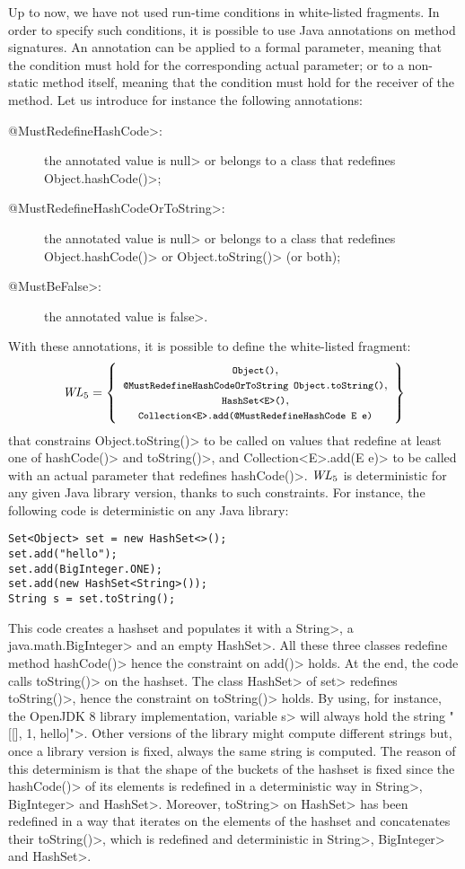 Up to now, we have not used run-time conditions in white-listed fragments.
In order to specify such conditions, it is possible to use Java annotations on
method signatures. An annotation can be applied to a formal parameter, meaning that
the condition must hold for the corresponding actual parameter; or to a non-static method
itself, meaning that the condition must hold for the receiver of the method.
Let us introduce for instance the following annotations:
%
\begin{description}
\item[\<@MustRedefineHashCode>:] the annotated value is \<null> or belongs to a class that redefines
  \<Object.hashCode()>;
\item[\<@MustRedefineHashCodeOrToString>:] the annotated value is \<null> or belongs to a class that redefines
  \<Object.hashCode()> or \<Object.toString()> (or both);
\item[\<@MustBeFalse>:] the annotated value is \<false>.
\end{description}
%
With these annotations, it is possible to define the white-listed fragment:
%
\[
\wl_5=\left\{\begin{array}{c}
\mbox{\<Object()>},\\
\mbox{\<@MustRedefineHashCodeOrToString Object.toString()>},\\
\mbox{\<HashSet$\text{<}$E$\text{>}$()>},\\
\mbox{\<Collection$\text{<}$E$\text{>}$.add(@MustRedefineHashCode E e)>}
\end{array}\right\}
\]
%
that constrains \<Object.toString()> to be called on values that redefine
at least one of \<hashCode()> and \<toString()>, and
\<Collection$\text{<}$E$\text{>}$.add(E e)> to be called
with an actual parameter that redefines \<hashCode()>. $\mathit{WL}_5$ is deterministic
for any given Java library version, thanks
to such constraints. For instance, the following code is deterministic
on any Java library:
%
\begin{verbatim}
Set<Object> set = new HashSet<>();
set.add("hello");
set.add(BigInteger.ONE);
set.add(new HashSet<String>());
String s = set.toString();
\end{verbatim}
%
This code creates a hashset and populates it with a
\<String>, a \<java.math.BigInteger> and an empty \<HashSet>. All these three
classes redefine method \<hashCode()> hence the constraint on \<add()> holds.
At the end, the code calls \<toString()> on the hashset.
The class \<HashSet> of \<set> redefines \<toString()>, hence the constraint
on \<toString()> holds. By using, for instance, the
OpenJDK 8 library implementation, variable \<s> will always hold the string
\<"[[], 1, hello]">. Other versions of the library might compute different strings but,
once a library version is fixed, always the same string is computed.
The reason of this determinism is that the shape of the buckets of the hashset is fixed
since the \<hashCode()> of its elements is redefined in a deterministic way in
\<String>, \<BigInteger> and \<HashSet>. Moreover, \<toString> on \<HashSet> has been
redefined in a way that iterates on the elements of the hashset and concatenates
their \<toString()>, which is redefined and deterministic in
\<String>, \<BigInteger> and \<HashSet>.

